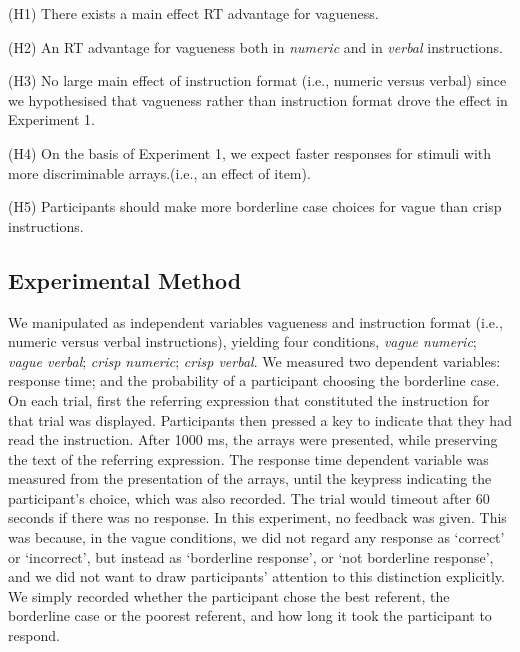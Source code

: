 \documentclass[%
man,		%
floatsintext,%
apacite%
]{apa6} %
\begin{document}
{\small
\begin{APAenumerate}
	\item [(H1)] There exists a main effect RT advantage for vagueness.
	\item [(H2)] An RT advantage for vagueness both in \emph{numeric} and in \emph{verbal} instructions.
	\item [(H3)] No large main effect of instruction format (i.e., numeric versus verbal) since we hypothesised that vagueness rather than instruction format drove the effect in Experiment 1.
	\item [(H4)] On the basis of Experiment 1, we expect faster responses for stimuli with more discriminable arrays.(i.e., an effect of item).
	\item [(H5)] Participants should make more borderline case choices for vague than crisp instructions.
\end{APAenumerate}
}

\subsection{Experimental Method} %
We manipulated as independent variables vagueness and instruction format (i.e., numeric versus verbal instructions), yielding four conditions, \emph{vague numeric}; \emph{vague verbal}; \emph{crisp numeric}; \emph{crisp verbal}.
We measured two dependent variables: response time; and the probability of a participant choosing the borderline case.
On each trial, first the referring expression that constituted the instruction for that trial was displayed. 
Participants then pressed a key to indicate that they had read the instruction. 
After 1000 ms, the arrays were presented, while preserving the text of the referring expression. 
The response time dependent variable was measured from the presentation of the arrays, until the keypress indicating the participant's choice, which was also recorded. 
The trial would timeout after 60 seconds if there was no response.
In this experiment, no feedback was given. 
This was because, in the vague conditions, we did not regard any response as `correct' or `incorrect', but instead as `borderline response', or `not borderline response', and we did not want to draw participants' attention to this distinction explicitly. 
We simply recorded whether the participant chose the best referent, the borderline case or the poorest referent, and how long it took the participant to respond.
\end{document}
